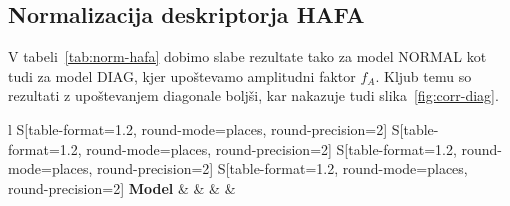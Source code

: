 \begin{comment}
\subsubsection{Jedro GHI}
\begin{table}[!htbp]
	\centering
	\begin{tabular}{l S[table-format=1.2, round-mode=places, round-precision=2] S[table-format=1.2, round-mode=places, round-precision=2] S[table-format=1.2, round-mode=places, round-precision=2] S[table-format=1.2, round-mode=places, round-precision=2]}
		\toprule
		\textbf{Model} & \thead{CORR} & \thead{RAE} & \thead{RRSE} & \thead{nSV} \\
		\midrule
		\bottomrule
	\end{tabular}
	\caption{Ghi vmax800}
	\label{tab:ghi}
\end{table}

\begin{figure}[!htbp]
	\centering
	\caption{Ghi best - eem-sv-lag(sv)}
	\label{fig:ghi}
\end{figure}
\end{comment}


\subsection{Normalizacija deskriptorja HAFA}
V tabeli~\ref{tab:norm-hafa} dobimo slabe rezultate tako za model NORMAL kot tudi za model DIAG, kjer upoštevamo amplitudni faktor $f_A$. Kljub temu so rezultati z upoštevanjem diagonale boljši, kar nakazuje tudi slika~\ref{fig:corr-diag}.

\begin{table}[!htbp]
	\centering
	\begin{tabular}{l S[table-format=1.2, round-mode=places, round-precision=2] S[table-format=1.2, round-mode=places, round-precision=2] S[table-format=1.2, round-mode=places, round-precision=2] S[table-format=1.2, round-mode=places, round-precision=2]}
		\toprule
		\textbf{Model} & \thead{\corr} & \thead{\rae} & \thead{\rrse} & \theadm{\nsv}\\
		\midrule
		\bottomrule
	\end{tabular}
	\caption[Evaluacijske metrike pri primerjavi modelov NORMAL in DIAG]{Evaluacijske metrike pri primerjavi modelov NORMAL in DIAG, kjer upoštevamo amplitudni faktor $f_A$. }
	\label{tab:norm-hafa}
\end{table}

